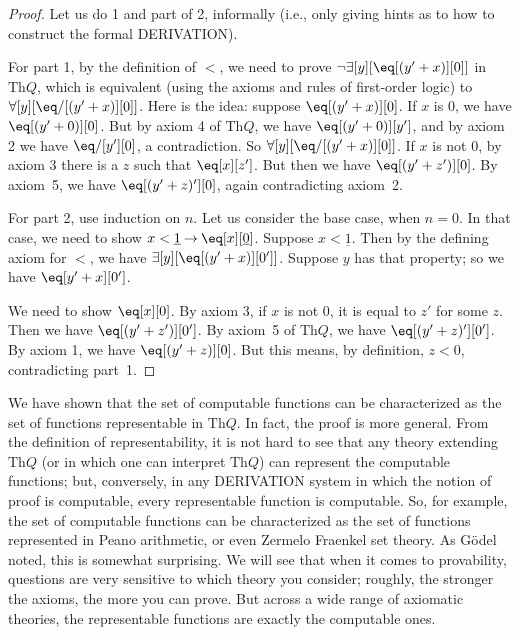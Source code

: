 \documentclass[10pt,a4paper]{article}
\newcommand*{\olup}[1]{\MakeUppercase{#1}}
\theoremstyle{plain}
\theoremstyle{definition}
\theoremstyle{remark}
\newenvironment{explain}{}{}
\providecommand{\lif}{\mathbin{\rightarrow}}
\providecommand{\lforall}{\mathord{\forall}}
\providecommand{\lexists}{\mathord{\exists}}
\providecommand{\Th}{\ensuremath{\mathrm{Th}}}
\providecommand{\num}[1]{\underline{#1}}
\begin{document}
\begin{proof}
Let us do 1 and part of 2, informally (i.e., only giving hints as to
how to construct the formal \olup{derivation}).

For part 1, by the definition of $<$, we need to prove $\lnot
\lexists[y][\eq[(y'+x)][0]]$ in $\Th{Q}$, which is equivalent (using
the axioms and rules of first-order logic) to $\lforall[y][\eq/[(y' +
    x)][0]]$. Here is the idea: suppose $\eq[(y'+x)][0]$. If $x$ is 0,
we have $\eq[(y' + 0)][0]$. But by axiom 4 of $\Th{Q}$, we have
$\eq[(y' + 0)][y']$, and by axiom 2 we have $\eq/[y'][0]$, a
contradiction. So $\lforall[y][\eq/[(y' +x)][0]]$. If $x$ is not $0$,
by axiom 3 there is a $z$ such that $\eq[x][z']$. But then we have
$\eq[(y' + z')][0]$. By axiom~5, we have $\eq[(y' + z)'][0]$, again
contradicting axiom~2.

For part 2, use induction on $n$. Let us consider the base case, when
$n =0$. In that case, we need to show $x < \num 1 \lif \eq[x][\num
  0]$. Suppose $x < \num 1$. Then by the defining axiom for $<$, we
have $\lexists[y][\eq[(y'+x)][0']]$. Suppose $y$ has that property; so
we have $\eq[y'+x][0']$.

We need to show $\eq[x][0]$. By axiom 3, if $x$ is not 0, it is equal
to $z'$ for some $z$. Then we have $\eq[(y' + z')][0']$. By axiom~5 of
  $\Th{Q}$, we have $\eq[(y'+z)'][0']$. By axiom 1, we have $\eq[(y' +
    z)][0]$. But this means, by definition, $z < 0$, contradicting
  part~1.
\end{proof}

\begin{explain}
We have shown that the set of computable functions can be
characterized as the set of functions representable in $\Th{Q}$. In fact,
the proof is more general. From the definition of representability, it
is not hard to see that any theory extending $\Th{Q}$ (or in which one can
interpret $\Th{Q}$) can represent the computable functions; but,
conversely, in any \olup{derivation} system in which the notion of proof is
computable, every representable function is computable. So, for
example, the set of computable functions can be characterized as the
set of functions represented in Peano arithmetic, or even Zermelo
Fraenkel set theory. As G\"odel noted, this is somewhat surprising.
We will see that when it comes to provability, questions are very
sensitive to which theory you consider; roughly, the stronger the
axioms, the more you can prove. But across a wide range of axiomatic
theories, the representable functions are exactly the computable ones.
\end{explain}
\end{document}
